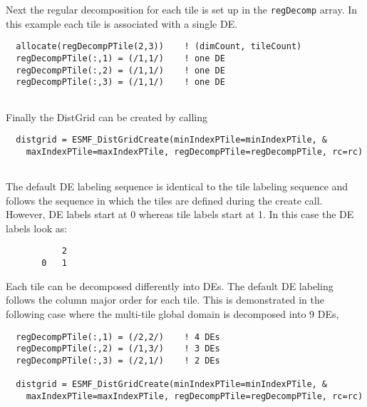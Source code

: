 
   Next the regular decomposition for each tile is set up in the
   {\tt regDecomp} array. In this example each tile is associated with a
   single DE. 

 \begin{verbatim}
  allocate(regDecompPTile(2,3))    ! (dimCount, tileCount)
  regDecompPTile(:,1) = (/1,1/)    ! one DE
  regDecompPTile(:,2) = (/1,1/)    ! one DE
  regDecompPTile(:,3) = (/1,1/)    ! one DE
 
\end{verbatim}
 

   Finally the DistGrid can be created by calling 

 \begin{verbatim}
  distgrid = ESMF_DistGridCreate(minIndexPTile=minIndexPTile, &
    maxIndexPTile=maxIndexPTile, regDecompPTile=regDecompPTile, rc=rc)
 
\end{verbatim}
 

   The default DE labeling sequence is identical to the tile labeling sequence
   and follows the sequence in which the tiles are defined during the create
   call. However, DE labels start at 0 whereas tile labels start at 1. In this 
   case the DE labels look as:
   \begin{verbatim}
           2
       0   1
   \end{verbatim}
  
   Each tile can be decomposed differently into DEs. The default DE labeling 
   follows the column major order for each tile. This is demonstrated in the
   following case where the multi-tile global domain is decomposed into 9 DEs, 

 \begin{verbatim}
  regDecompPTile(:,1) = (/2,2/)    ! 4 DEs
  regDecompPTile(:,2) = (/1,3/)    ! 3 DEs
  regDecompPTile(:,3) = (/2,1/)    ! 2 DEs
  
  distgrid = ESMF_DistGridCreate(minIndexPTile=minIndexPTile, &
    maxIndexPTile=maxIndexPTile, regDecompPTile=regDecompPTile, rc=rc)
 
\end{verbatim}
 
